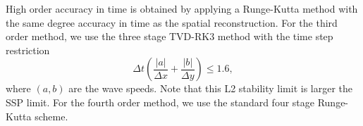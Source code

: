 High order accuracy in time is obtained by applying a Runge-Kutta method   
with the same degree accuracy in time  as the spatial reconstruction.
For the third order method, we use the three stage TVD-RK3 method
with the time step restriction
\begin{equation}
\Delta t \left( \frac{|a|}{\Delta x} + \frac{|b|}{\Delta y} \right) \leq 1.6,
\end{equation}
where $(a,b)$ are the wave speeds.
Note that this L2 stability limit is larger the SSP limit.
For the fourth order method, we use the standard four stage Runge-Kutta
scheme.
